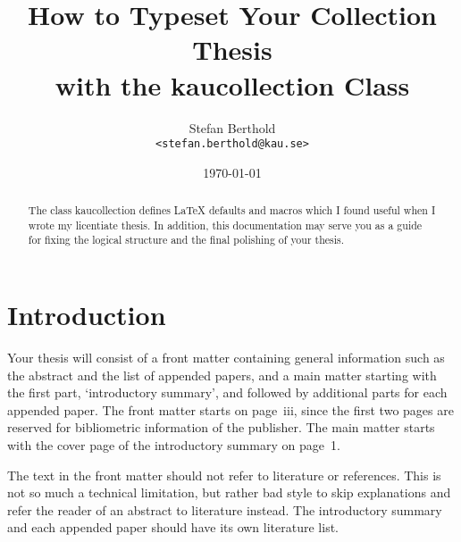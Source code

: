 \documentclass[a4paper]{ltxguide}
\title{How to Typeset Your Collection Thesis\\with the \textsf{kaucollection} Class}
\author{Stefan Berthold\\\texttt{<stefan.berthold@kau.se>}}
\date{\today}
\begin{document}
\maketitle

\begin{abstract}
  The class \textsf{kaucollection} defines \LaTeX{} defaults and macros which I found useful when I wrote my licentiate thesis. In addition, this documentation may serve you as a guide for fixing the logical structure and the final polishing of your thesis.
\end{abstract}

\tableofcontents

\section{Introduction}


Your thesis will consist of a front matter containing general information such as the abstract and the list of appended papers, and a main matter starting with the first part, `introductory summary', and followed by additional parts for each appended paper. The front matter starts on page~iii, since the first two pages are reserved for bibliometric information of the publisher. The main matter starts with the cover page of the introductory summary on page~1.

The text in the front matter should not refer to literature or references. This is not so much a technical limitation, but rather bad style to skip explanations and refer the reader of an abstract to literature instead. The introductory summary and each appended paper should have its own literature list.
\end{document}
